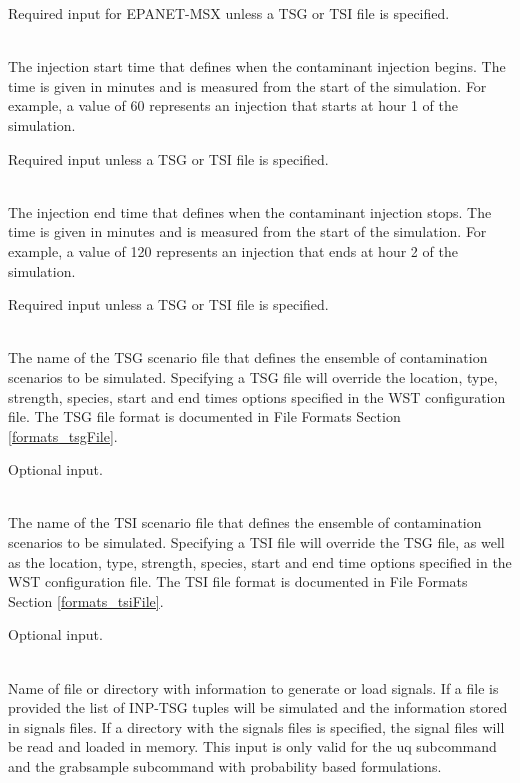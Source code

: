 \begin{description}[topsep=0pt,parsep=0.5em,itemsep=-0.4em]
\begin{description}[topsep=0pt,parsep=0.5em,itemsep=-0.4em]
                Required input for EPANET-MSX unless a TSG or TSI file is specified.
    \item[{start time}]\hfill
\\The injection start time that defines when the contaminant injection begins. 
                The time is given in minutes and is measured from the start of the simulation. 
                For example, a value of 60 represents an injection that starts at hour 1 of the simulation.
                
                Required input unless a TSG or TSI file is specified.
    \item[{end time}]\hfill
\\The injection end time that defines when the contaminant injection stops.				
                The time is given in minutes and is measured from the start of the simulation.
                For example, a value of 120 represents an injection that ends at hour 2 of the simulation.
                
                Required input unless a TSG or TSI file is specified.
    \item[{tsg file}]\hfill
\\The name of the TSG scenario file that defines the ensemble of contamination
                scenarios to be simulated. Specifying a TSG file will
                override the location, type, strength, species, start and end times options specified in
                the WST configuration file. The TSG file format is documented in File Formats Section \ref{formats_tsgFile}.
                
                Optional input.
    \item[{tsi file}]\hfill
\\The name of the TSI scenario file that defines the ensemble of contamination
                scenarios to be simulated. Specifying a TSI file will
                override the TSG file, as well as the location, type, strength, species, start and end time options specified in
                the WST configuration file. The TSI file format is documented in File Formats Section \ref{formats_tsiFile}.
                
                Optional input.
    \item[{signals}]\hfill
\\Name of file or directory with information to generate 
                or load signals. If a file is provided the list of INP-TSG tuples
                 will be simulated and the information stored in signals files. If
                a directory with the signals files is specified, the signal files will
                be read and loaded in memory. This input is only valid for the uq
                subcommand and the grabsample subcommand with probability based formulations.


\end{description}
\end{description}
